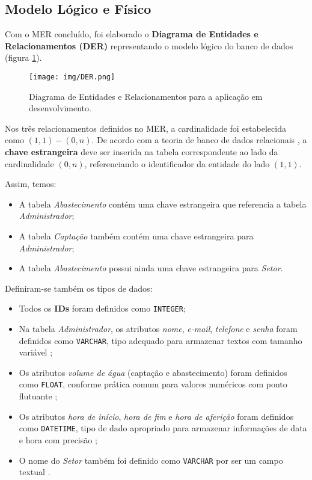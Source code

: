 \subsection{Modelo Lógico e Físico}\label{subsec:nodeloLogicoFisico}

Com o MER concluído, foi elaborado o \textbf{Diagrama de Entidades e Relacionamentos (DER)} \cite{dateBD} representando o modelo lógico do banco de dados (figura \ref{fig:DER}).

\begin{figure}[htbp!]
    \centering
    \suppressfloats[t]
    \texttt{[image: img/DER.png]}
    \caption{Diagrama de Entidades e Relacionamentos para a aplicação em desenvolvimento.}
    \label{fig:DER}
\end{figure}

Nos três relacionamentos definidos no MER, a cardinalidade foi estabelecida como \textbf{$(1, 1) - (0, n)$}. De acordo com a teoria de banco de dados relacionais \cite{heuser}, a \textbf{chave estrangeira} deve ser inserida na tabela correspondente ao lado da cardinalidade $(0, n)$, referenciando o identificador da entidade do lado $(1, 1)$.

Assim, temos:
\begin{itemize}
    \item A tabela \textit{Abastecimento} contém uma chave estrangeira que referencia a tabela \textit{Administrador};
    \item A tabela \textit{Captação} também contém uma chave estrangeira para \textit{Administrador};
    \item A tabela \textit{Abastecimento} possui ainda uma chave estrangeira para \textit{Setor}.
\end{itemize}

Definiram-se também os tipos de dados:
\begin{itemize}
    \item Todos os \textbf{IDs} foram definidos como \verb|INTEGER|;
    \item Na tabela \textit{Administrador}, os atributos \textit{nome}, \textit{e-mail}, \textit{telefone} e \textit{senha} foram definidos como \verb|VARCHAR|, tipo adequado para armazenar textos com tamanho variável \cite{heuser};
    \item Os atributos \textit{volume de água} (captação e abastecimento) foram definidos como \verb|FLOAT|, conforme prática comum para valores numéricos com ponto flutuante \cite{dateBD};
    \item Os atributos \textit{hora de início}, \textit{hora de fim} e \textit{hora de aferição} foram definidos como \verb|DATETIME|, tipo de dado apropriado para armazenar informações de data e hora com precisão \cite{dateBD};
    \item O nome do \textit{Setor} também foi definido como \verb|VARCHAR| por ser um campo textual \cite{heuser}.
\end{itemize}

